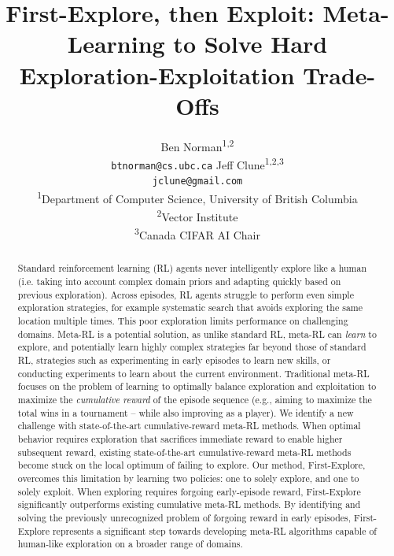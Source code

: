 \documentclass{article}
\title{First-Explore, then Exploit: Meta-Learning to Solve Hard Exploration-Exploitation Trade-Offs}
\author{
  Ben Norman\textsuperscript{1,2} \\ \texttt{btnorman@cs.ubc.ca}
  \And Jeff Clune\textsuperscript{1,2,3} \\ \texttt{jclune@gmail.com}
  \And
  \vspace{-0.6cm}\\
  \textsuperscript{1}Department of Computer Science, University of British Columbia\\
  \textsuperscript{2}Vector Institute\\
  \textsuperscript{3}Canada CIFAR AI Chair\\
}
\begin{document}
\maketitle
\begin{abstract}
Standard reinforcement learning (RL) agents never intelligently explore like a human (i.e. taking into account complex domain priors and adapting quickly based on previous exploration). Across episodes, RL agents struggle to perform even simple exploration strategies, for example systematic search that avoids exploring the same location multiple times. This poor exploration limits performance on challenging domains. Meta-RL is a potential solution, as unlike standard RL, meta-RL can \emph{learn} to explore, and potentially learn highly complex strategies far beyond those of standard RL, strategies such as experimenting in early episodes to learn new skills, or conducting experiments to learn about the current environment.
Traditional meta-RL focuses on the problem of learning to optimally balance exploration and exploitation to maximize the \emph{cumulative reward} of the episode sequence (e.g., aiming to maximize the total wins in a tournament -- while also improving as a player).
We identify a new challenge with state-of-the-art cumulative-reward meta-RL methods.
When optimal behavior requires exploration that sacrifices immediate reward to enable higher subsequent reward, existing state-of-the-art cumulative-reward meta-RL methods become stuck on the local optimum of failing to explore.
Our method, First-Explore, overcomes this limitation by learning two policies: one to solely explore, and one to solely exploit. When exploring requires forgoing early-episode reward, First-Explore significantly outperforms existing cumulative meta-RL methods. By identifying and solving the previously unrecognized problem of forgoing reward in early episodes, First-Explore represents a significant step towards developing meta-RL algorithms capable of human-like exploration on a broader range of domains.
\end{abstract}
\end{document}
